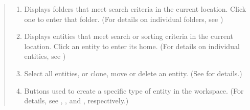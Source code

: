 \documentclass[letterpaper,10pt,english]{sphinxmanual}
\begin{document}
\begin{quote}
\begin{enumerate}
\begin{itemize}
\end{itemize}

\item {} 
 Displays folders that meet search criteria in the current location. Click one to enter that folder. (For details on individual folders, see {\hyperref[\detokenize{discovery/part03/workspace_management:folders}]{}})

\item {} 
 Displays entities that meet search or sorting criteria in the current location. Click an entity to enter its home. (For details on individual entities, see {\hyperref[\detokenize{discovery/part03/workspace_management:items}]{}})

\item {} 
 Select all entities, or clone, move or delete an entity. (See {\hyperref[\detokenize{discovery/part03/workspace_management:actions}]{}} for details.)

\item {} 
 Buttons used to create a specific type of entity in the workspace. (For details, see {\hyperref[\detokenize{discovery/part04/create_a_workbook::doc}]{}}, {\hyperref[\detokenize{discovery/part05/create_a_notebook::doc}]{}}, and {\hyperref[\detokenize{discovery/part06/06_02-create_a_workbench::doc}]{}}, respectively.)

\end{enumerate}
\end{quote}
\end{document}
